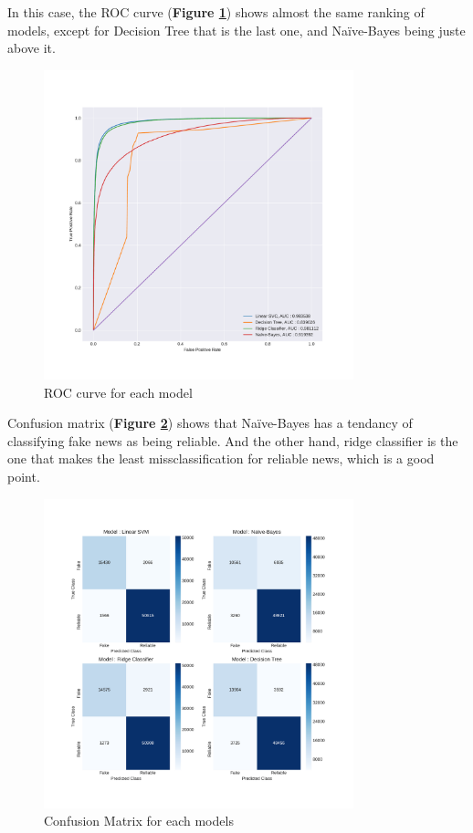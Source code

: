 In this case, the ROC curve (\textbf{Figure \ref{fig:chap3:roc2}}) shows almost the same ranking of models, except for Decision Tree that is the last one, and Naïve-Bayes being juste above it. 

\begin{figure}
	\centering
	\includegraphics[width=0.8\textwidth]{images/chapitre3/roc2}
	\caption{ROC curve for each model}
	\label{fig:chap3:roc2}
\end{figure}

Confusion matrix (\textbf{Figure \ref{fig:chap3:confMat2}}) shows that Naïve-Bayes has a tendancy of classifying fake news as being reliable. And the other hand, ridge classifier is the one that makes the least missclassification for reliable news, which is a good point. \\

\begin{figure}
	\centering
	\includegraphics[width=0.8\textwidth]{images/chapitre3/test_fake_confMat}
	\caption{Confusion Matrix for each models}
	\label{fig:chap3:confMat2}
\end{figure}


